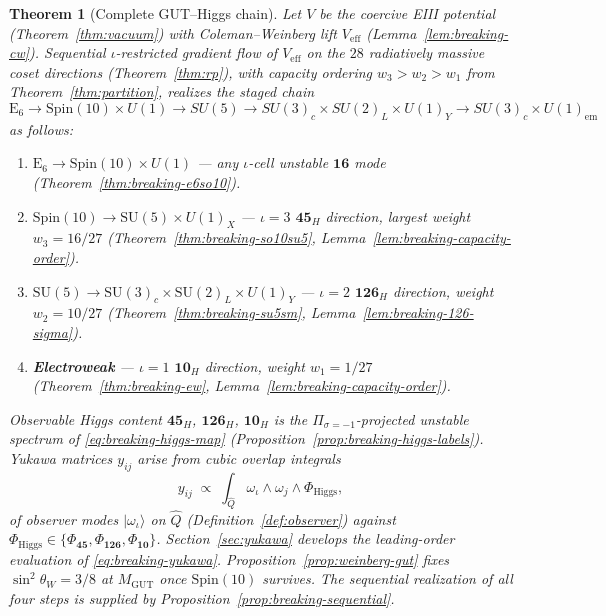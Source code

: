 \documentclass[11pt]{article}
\theoremstyle{plain}
\newtheorem{theorem}{Theorem}[section]
\theoremstyle{definition}
\theoremstyle{remark}
\numberwithin{equation}{section}
\newcommand{\E}[1]{\mathrm{E}_{#1}}
\newcommand{\Spin}{\mathrm{Spin}}
\begin{document}
\begin{theorem}[Complete GUT--Higgs chain]\label{thm:breaking-complete}
Let $V$ be the coercive EIII potential (Theorem~\ref{thm:vacuum}) with
Coleman--Weinberg lift $V_{\mathrm{eff}}$ (Lemma~\ref{lem:breaking-cw}).
Sequential $\iota$-restricted gradient flow of $V_{\mathrm{eff}}$ on the $28$
radiatively massive coset directions (Theorem~\ref{thm:rp}), with capacity
ordering $w_3>w_2>w_1$ from Theorem~\ref{thm:partition}, realizes the staged
chain
\begin{equation}\label{eq:breaking-chain}
  \E{6}\to\Spin(10)\times U(1)\to SU(5)\to SU(3)_c\times SU(2)_L\times U(1)_Y
  \to SU(3)_c\times U(1)_{\mathrm{em}}
\end{equation}
as follows:
\begin{enumerate}[label=\textbf{(\arabic*)},leftmargin=*]
  \item \textbf{$\E{6}\to\Spin(10)\times U(1)$} --- any $\iota$-cell unstable
    $\mathbf{16}$ mode (Theorem~\ref{thm:breaking-e6so10}).
  \item \textbf{$\Spin(10)\to\mathrm{SU}(5)\times U(1)_X$} --- $\iota=3$
    $\mathbf{45}_H$ direction, largest weight $w_3=16/27$
    (Theorem~\ref{thm:breaking-so10su5},
    Lemma~\ref{lem:breaking-capacity-order}).
  \item \textbf{$\mathrm{SU}(5)\to\mathrm{SU}(3)_c\times\mathrm{SU}(2)_L
    \times U(1)_Y$} --- $\iota=2$ $\mathbf{126}_H$ direction, weight
    $w_2=10/27$ (Theorem~\ref{thm:breaking-su5sm},
    Lemma~\ref{lem:breaking-126-sigma}).
  \item \textbf{Electroweak} --- $\iota=1$ $\mathbf{10}_H$ direction, weight
    $w_1=1/27$ (Theorem~\ref{thm:breaking-ew},
    Lemma~\ref{lem:breaking-capacity-order}).
\end{enumerate}
Observable Higgs content $\mathbf{45}_H$, $\mathbf{126}_H$, $\mathbf{10}_H$ is
the $\Pi_{\sigma=-1}$-projected unstable spectrum of
\eqref{eq:breaking-higgs-map} (Proposition~\ref{prop:breaking-higgs-labels}).
Yukawa matrices $y_{ij}$ arise from cubic overlap integrals
\begin{equation}\label{eq:breaking-yukawa}
  y_{ij}\;\propto\;\int_{\hat Q}\omega_\iota\wedge\omega_j\wedge\Phi_{\mathrm{Higgs}},
\end{equation}
of observer modes $|\omega_\iota\rangle$ on $\hat Q$
(Definition~\ref{def:observer}) against $\Phi_{\mathrm{Higgs}}\in\{\Phi_{\mathbf{45}},
\Phi_{\mathbf{126}},\Phi_{\mathbf{10}}\}$. Section~\ref{sec:yukawa} develops
the leading-order evaluation of \eqref{eq:breaking-yukawa}.
Proposition~\ref{prop:weinberg-gut} fixes $\sin^2\theta_W=3/8$ at
$M_{\mathrm{GUT}}$ once $\Spin(10)$ survives. The sequential realization of all
four steps is supplied by Proposition~\ref{prop:breaking-sequential}.
\end{theorem}
\end{document}
